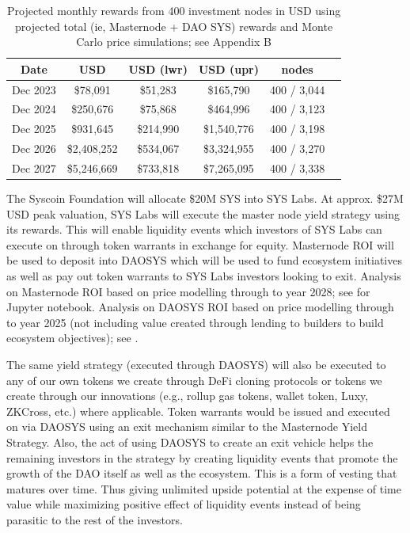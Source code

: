 \documentclass[journal,twocolumn,12pt]{ieeesyscoin}
\begin{document}
\begin{table}[h]
\centering
\begin{tabular}{ |c|c|c|c|c|c| } 
\hline
 \textbf{Date} & \textbf{USD} & \textbf{USD (lwr)} & \textbf{USD (upr)} & \textbf{nodes} \\
\hline
Dec 2023 & \$78,091 & \$51,283 & \$165,790 & 400 / 3,044\\
Dec 2024 & \$250,676 & \$75,868 & \$464,996  & 400 / 3,123 \\
Dec 2025 & \$931,645 & \$214,990 & \$1,540,776 & 400 / 3,198 \\
Dec 2026 & \$2,408,252 & \$534,067 & \$3,324,955 & 400 / 3,270 \\
Dec 2027 & \$5,246,669 & \$733,818 & \$7,265,095 & 400 / 3,338 \\
\hline
\end{tabular}
\caption{Projected monthly rewards from 400 investment nodes in USD using projected total (ie, Masternode + DAO SYS) rewards and Monte Carlo price simulations; see Appendix B}
\label{table:mn_returns}
\end{table}

The Syscoin Foundation will allocate \$20M SYS into SYS Labs. At approx. \$27M USD peak valuation, SYS Labs will execute the master node yield strategy using its rewards. This will enable liquidity events which investors of SYS Labs can execute on through token warrants in exchange for equity. Masternode ROI will be used to deposit into DAOSYS which will be used to fund ecosystem initiatives as well as pay out token warrants to SYS Labs investors looking to exit. Analysis on Masternode ROI based on price modelling through to year 2028; see \cite{DAOSim22} for Jupyter notebook. Analysis on DAOSYS ROI based on price modelling through to year 2025 (not including value created through lending to builders to build ecosystem objectives); see \cite{DAOSim22}.

The same yield strategy (executed through DAOSYS) will also be executed to any of our own tokens we create through DeFi cloning protocols or tokens we create through our innovations (e.g., rollup gas tokens, wallet token, Luxy, ZKCross, etc.) where applicable. Token warrants would be issued and executed on via DAOSYS using an exit mechanism similar to the Masternode Yield Strategy. Also, the act of using DAOSYS to create an exit vehicle helps the remaining investors in the strategy by creating liquidity events that promote the growth of the DAO itself as well as the ecosystem. This is a form of vesting that matures over time. Thus giving unlimited upside potential at the expense of time value while maximizing positive effect of liquidity events instead of being parasitic to the rest of the investors.
\end{document}
